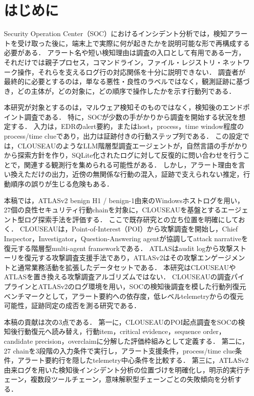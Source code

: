 

\section{はじめに}

Security Operation Center（SOC）におけるインシデント分析では，検知アラートを受け取った後に，端末上で実際に何が起きたかを説明可能な形で再構成する必要がある．
アラート名や短い検知理由は調査の入口として有用である一方，それだけでは親子プロセス，コマンドライン，ファイル・レジストリ・ネットワーク操作，それらを支えるログ行の対応関係を十分に説明できない．
調査者が最終的に必要とするのは，単なる悪性・良性のラベルではなく，観測証跡に基づき，どの主体が，どの対象に，どの順序で操作したかを示す行動列である．

本研究が対象とするのは，マルウェア検知そのものではなく，検知後のエンドポイント調査である．
特に，SOCが少数の手がかりから調査を開始する状況を想定する．
入力は，EDRのalert要約，またはhost，process，time window程度のprocess/time clueであり，出力は証跡付きの行動ステップ列である．
この設定では，CLOUSEAUのようなLLM階層型調査エージェント\cite{clouseau}が，自然言語の手がかりから探索方針を作り，SQLite化されたログに対して反復的に問い合わせを行うことで，関連する観測行を集められる可能性がある．
しかし，アラート理由を言い換えただけの出力，近傍の無関係な行動の混入，証跡で支えられない推定，行動順序の誤りが生じる危険もある．

本稿では，ATLASv2 benign H1 / benign-1由来のWindowsホストログを用い，27個の良性セキュリティ行動chainを対象に，CLOUSEAUを基盤とするエージェント型ログ探索手法を評価する．
ここで既存研究との立ち位置を明確にしておく．
CLOUSEAUは，Point-of-Interest（POI）から攻撃調査を開始し，Chief Inspector，Investigator，Question-Answering agentが協調してattack narrativeを復元する階層型multi-agent frameworkである\cite{clouseau}．
ATLASはaudit logから攻撃ストーリを復元する攻撃調査支援手法であり\cite{atlas}，ATLASv2はその攻撃エンゲージメントと通常業務活動を拡張したデータセットである\cite{atlasv2}．
本研究はCLOUSEAUやATLASを置き換える攻撃調査アルゴリズムではない．
CLOUSEAUの調査パイプラインとATLASv2のログ環境を用い，SOCの検知後調査を模した行動列復元ベンチマークとして，アラート要約への依存度，低レベルtelemetryからの復元可能性，証跡同定の成否を測る研究である．

本稿の貢献は次の3点である．
第一に，CLOUSEAUのPOI起点調査をSOCの検知後行動復元へ読み替え，行動item，critical evidence，sequence order，candidate precision，overclaimに分解した評価枠組みとして定義する．
第二に，27 chainを3段階の入力条件で実行し，アラート支援条件，process/time clue条件，アラート要約行を隠したtelemetry中心条件を比較する．
第三に，ATLASv2由来ログを用いた検知後インシデント分析の位置づけを明確化し，明示的実行チェーン，複数段ツールチェーン，意味解釈型チェーンごとの失敗傾向を分析する．


